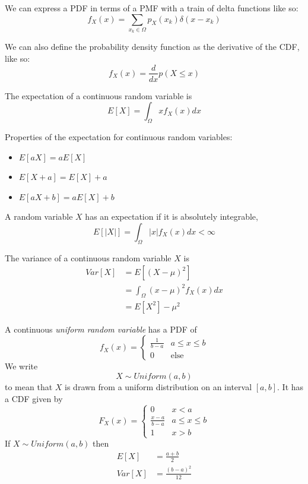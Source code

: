 We can express a PDF in terms of a PMF
with a train of delta functions like so:
\begin{equation}
    f_X(x) = \sum_{x_k \in \Omega} p_X(x_k) \delta(x - x_k)
\end{equation}

We can also define the probability density
function as the derivative of the CDF, like so:
\begin{equation}
    f_X(x) = \frac{d}{dx}p(X \leq x)
\end{equation}

The expectation of a continuous random variable is
\begin{equation}
    E[X] = \int_{\Omega} xf_X(x)dx
\end{equation}

Properties of the expectation for continuous
random variables:
\begin{itemize}
    \item $E[aX] = aE[X]$
    \item $E[X+a] = E[X] + a$
    \item $E[aX+b] = aE[X] + b$
\end{itemize}

A random variable $X$ has an expectation
if it is absolutely integrable,
\begin{equation}
    E[|X|] = \int_{\Omega} |x|f_X(x)dx < \infty
\end{equation}

The variance of a continuous random variable
$X$ is
\begin{align}
    Var[X] & = E[(X-\mu)^2]                    \\
           & = \int_{\Omega} (x-\mu)^2f_X(x)dx \\
           & = E[X^2] - \mu^2
\end{align}

A continuous \emph{uniform random variable}
has a PDF of
\begin{equation}
    f_X(x) = \begin{cases}
        \frac{1}{b-a} & a \leq x \leq b \\
        0             & \text{else}
    \end{cases}
\end{equation}
We write
\begin{equation}
    X \sim Uniform(a,b)
\end{equation}
to mean that $X$ is drawn from a uniform
distribution on an interval $[a, b]$.
It has a CDF given by
\begin{equation}
    F_X(x) = \begin{cases}
        0               & x < a           \\
        \frac{x-a}{b-a} & a \leq x \leq b \\
        1               & x > b
    \end{cases}
\end{equation}
If $X \sim Uniform(a,b)$ then
\begin{align}
    E[X]   & = \frac{a + b}{2}      \\
    Var[X] & = \frac{(b - a)^2}{12}
\end{align}

